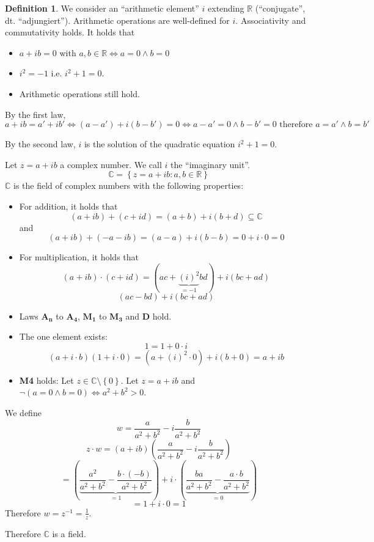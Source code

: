 \documentclass[a4paper,landscape,twocolumn]{article}
\theoremstyle{definition}
\newtheorem{defi}{Definition}
\newcommand\set[1]{\left\{#1\right\}}
\begin{document}
\begin{defi}
  We consider an \enquote{arithmetic element} $i$ extending $\mathbb R$
  (\enquote{conjugate}, dt. \enquote{\foreignlanguage{ngerman}{adjungiert}}).
  Arithmetic operations are well-defined for $i$. Associativity and commutativity holds.
  It holds that
  \begin{itemize}
    \item $a + ib = 0$ with $a,b \in \mathbb R \Leftrightarrow a = 0 \land b = 0$
    \item $i^2 = -1$ i.e. $i^2 + 1 = 0$.
    \item Arithmetic operations still hold.
  \end{itemize}

  By the first law,
  \[
    a + ib = a' + ib' \Leftrightarrow (a - a') + i(b - b') = 0
    \Leftrightarrow a - a' = 0 \land b - b' = 0 \text{ therefore }
    a = a' \land b = b'
  \]

  By the second law, $i$ is the solution of the quadratic equation $i^2 + 1 = 0$.

  Let $z = a + ib$ a complex number. We call $i$ the \enquote{imaginary unit}.
  \[ \mathbb C = \set{z = a + ib : a,b \in \mathbb R} \]
  $\mathbb C$ is the field of complex numbers with the following properties:
  \begin{itemize}
    \item For addition, it holds that
      \[ (a + ib) + (c + id) = (a + b) + i (b + d) \subseteq \mathbb C \]
      and
      \[ (a + ib) + (-a - ib) = (a - a) + i(b - b) = 0 + i \cdot 0 = 0 \]
    \item For multiplication, it holds that
      \[ (a + ib) \cdot (c + id) = (ac + \underbrace{(i)^2}_{=-1} b d) + i (bc + ad) \]
      \[ (ac - bd) + i (bc + ad) \]
    \item Laws $\mathbf{A_n}$ to $\mathbf{A_4}$, $\mathbf{M_1}$ to $\mathbf{M_3}$ and $\mathbf{D}$ hold.
    \item The one element exists:
      \[ 1 = 1 + 0 \cdot i \]
      \[ (a + i \cdot b) (1 + i \cdot 0) = (a + (i)^2 \cdot 0) + i (b + 0) = a + ib \]
    \item \textbf{M4} holds: Let $z \in \mathbb C \setminus \set{0}$.
      Let $z = a + ib$ and $\neg(a = 0 \land b = 0) \Leftrightarrow a^2 + b^2 > 0$.
  \end{itemize}

  We define
  \[ w = \frac{a}{a^2 + b^2} - i \frac{b}{a^2 + b^2} \]
  \[ z \cdot w = \left(a + ib\right) \left(\frac{a}{a^2 + b^2} - i \frac{b}{a^2 + b^2}\right) \]
  \[
      = \left(\underbrace{\frac{a^2}{a^2 + b^2} - \frac{b \cdot (-b)}{a^2 + b^2}}_{=1}\right)
      + i \cdot \left(\underbrace{\frac{ba}{a^2 + b^2} - \frac{a\cdot b}{a^2 + b^2}}_{=0}\right)
  \] \[
    = 1 + i \cdot 0 = 1
  \]
  Therefore $w = z^{-1} = \frac1z$.

  Therefore $\mathbb C$ is a field.
\end{defi}
\end{document}
